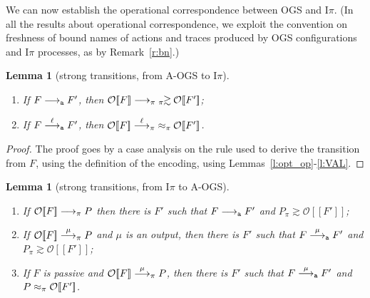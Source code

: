 \documentclass[11pt,a4paper]{amsart}
\theoremstyle{plain}
\theoremstyle{definition}
\theoremstyle{defC}
\theoremstyle{thmC}
\theoremstyle{plain}
\numberwithin{equation}{section}
\newcommand{\AOGS}{\mbox{{\rm A-OGS}}\xspace}      %
\newcommand{\rmm}[1]{{\tt{\lowercase{#1}}}}
\newcommand{\genarr}[2]{\mathrel{\stackrel{{#1}}{\longrightarrow}_{\rmm{\lowercase{#2}}}}}
\newcommand{\genlongrightarrow}[1]{\mathrel{\longrightarrow_{\rmm{\lowercase{#1}}}}}
\newcommand{\arrPI}[1]{\genarr{#1}{\pi}}   %
\newcommand{\longrightarrowPI}{\genlongrightarrow{\pi}}
\newcommand{\arrA}[1]{\genarr{#1}{A}}  %
\newcommand{\longrightarrowA}{\genlongrightarrow{A}}
\newcommand{\genwb}[1]{\mathrel{\approx_{\rmm{\lowercase{#1}}}}}       %
\newcommand{\wbPI}{\genwb{\pi}}       %
\newcommand{\contr}{\mathrel{\mbox{}_{\pi}\!\!\gtrsim}}
\newcommand{\FF}{F}
\newcommand{\PP}{P}
\newcommand{\encoEnvV}[1]{{\mathcal {O}} [\! [ #1 ] \! ]  } %
\newcommand{\encoConV}{\encoEnvV} %
\newcommand{\Intp}{\mbox{I$\pi$}\xspace}   %
\newcommand{\piI}{\Intp}   %
\theoremstyle{plain}
\newtheorem{lemma}[thm]{Lemma}
\theoremstyle{definition}
\begin{document}
\fi




\noindent
We can now establish the operational correspondence between OGS and \piI. 
(In all the results about operational correspondence, we exploit the convention on
freshness of bound names of actions and traces produced by OGS configurations and \piI
processes, as by Remark~\ref{r:bn}.)
\begin{lemma}[strong transitions, from \AOGS to \piI]
\label{l:opcorrCON_str}
$ $ \begin{enumerate}

\item If $\FF \longrightarrowA \FF'$, then 
$ \encoConV \FF \longrightarrowPI  {\contr} \: \encoConV {\FF'}$;


\item If $\FF \arrA\ell \FF'$, then
$ \encoConV \FF \arrPI\ell  
 {\wbPI} \:
\encoConV {\FF'}$.
\end{enumerate} 
\end{lemma} 

\begin{proof}
The proof goes by a case analysis on the rule used to derive the transition from 
$\FF $, using the definition of the encoding, using Lemmas~\ref{l:opt_op}-\ref{l:VAL}.
\end{proof} 



\begin{lemma}[strong transitions,  from  \piI to \AOGS]
\label{l:opcorrCON2}
$ $
\begin{enumerate}
\item If 
$ \encoConV \FF \longrightarrowPI \PP$ then there is $\FF'$ such that 
$\FF \longrightarrowA \FF'$  and  
$\PP   \contr \encoConV {\FF'}$; 

\item If
$ \encoConV \FF \arrPI\mu \PP$
and $\mu$ is an output, 
then there is $\FF'$ such that
$\FF \arrA\mu \FF'$
and $\PP \contr \encoConV {\FF'}$;

\item If  $\FF$ is passive and 
$ \encoConV \FF \arrPI{\mu} \PP$, 
then 
 there is $\FF'$ such that 
$\FF \arrA{\mu} \FF'$
and $\PP  \wbPI \encoConV {\FF'}$.
\end{enumerate} 
\end{lemma} 
\end{document}
